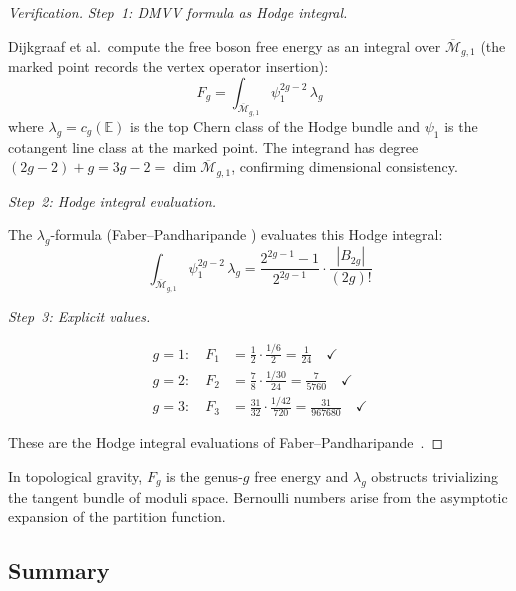\begin{proof}[Verification]

\emph{Step~1: DMVV formula as Hodge integral.}

Dijkgraaf et al.\ compute the free boson free energy as an integral over $\overline{\mathcal{M}}_{g,1}$ (the marked point records the vertex operator insertion):
\[F_g = \int_{\overline{\mathcal{M}}_{g,1}} \psi_1^{2g-2}\,\lambda_g\]
where $\lambda_g = c_g(\mathbb{E})$ is the top Chern class of the Hodge bundle and $\psi_1$ is the cotangent line class at the marked point.  The integrand has degree $(2g-2) + g = 3g-2 = \dim \overline{\mathcal{M}}_{g,1}$, confirming dimensional consistency.

\emph{Step~2: Hodge integral evaluation.}

The $\lambda_g$-formula (Faber--Pandharipande \cite{FP00}) evaluates this Hodge integral:
\[\int_{\overline{\mathcal{M}}_{g,1}} \psi_1^{2g-2}\,\lambda_g = \frac{2^{2g-1}-1}{2^{2g-1}} \cdot \frac{|B_{2g}|}{(2g)!}\]

\emph{Step~3: Explicit values.}

\begin{align}
g=1: \quad F_1 &= \frac{1}{2} \cdot \frac{1/6}{2}
= \frac{1}{24} \quad \checkmark \\
g=2: \quad F_2 &= \frac{7}{8} \cdot \frac{1/30}{24}
= \frac{7}{5760} \quad \checkmark \\
g=3: \quad F_3 &= \frac{31}{32} \cdot \frac{1/42}{720}
= \frac{31}{967680} \quad \checkmark
\end{align}

These are the Hodge integral evaluations of Faber--Pandharipande~\cite{FP00}.
\end{proof}

\begin{remark}\label{rem:witten-perspective}
In topological gravity, $F_g$ is the genus-$g$ free energy and $\lambda_g$ obstructs trivializing the tangent bundle of moduli space.  Bernoulli numbers arise from the asymptotic expansion of the partition function.
\end{remark}

\subsection{Summary}
\label{subsec:heisenberg-dictionary-complete}

